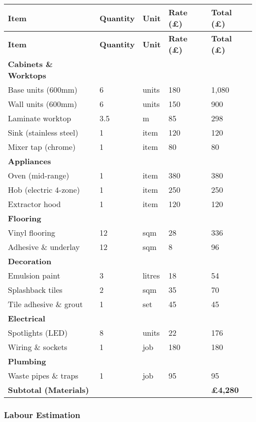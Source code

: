 \documentclass[11pt,a4paper]{article}
\begin{document}
\begin{longtable}{@{}p{5cm}p{2cm}p{1.5cm}p{2cm}p{2.5cm}@{}}
\toprule
\textbf{Item} & \textbf{Quantity} & \textbf{Unit} & \textbf{Rate (£)} & \textbf{Total (£)} \\
\midrule
\endfirsthead
\toprule
\textbf{Item} & \textbf{Quantity} & \textbf{Unit} & \textbf{Rate (£)} & \textbf{Total (£)} \\
\midrule
\endhead
\textbf{Cabinets \& Worktops} & & & & \\
Base units (600mm) & 6 & units & 180 & 1,080 \\
Wall units (600mm) & 6 & units & 150 & 900 \\
Laminate worktop & 3.5 & m & 85 & 298 \\
Sink (stainless steel) & 1 & item & 120 & 120 \\
Mixer tap (chrome) & 1 & item & 80 & 80 \\
\addlinespace
\textbf{Appliances} & & & & \\
Oven (mid-range) & 1 & item & 380 & 380 \\
Hob (electric 4-zone) & 1 & item & 250 & 250 \\
Extractor hood & 1 & item & 120 & 120 \\
\addlinespace
\textbf{Flooring} & & & & \\
Vinyl flooring & 12 & sqm & 28 & 336 \\
Adhesive \& underlay & 12 & sqm & 8 & 96 \\
\addlinespace
\textbf{Decoration} & & & & \\
Emulsion paint & 3 & litres & 18 & 54 \\
Splashback tiles & 2 & sqm & 35 & 70 \\
Tile adhesive \& grout & 1 & set & 45 & 45 \\
\addlinespace
\textbf{Electrical} & & & & \\
Spotlights (LED) & 8 & units & 22 & 176 \\
Wiring \& sockets & 1 & job & 180 & 180 \\
\addlinespace
\textbf{Plumbing} & & & & \\
Waste pipes \& traps & 1 & job & 95 & 95 \\
\addlinespace
\midrule
\textbf{Subtotal (Materials)} & & & & \textbf{£4,280} \\
\bottomrule
\end{longtable}

\subsubsection{Labour Estimation}
\end{document}
